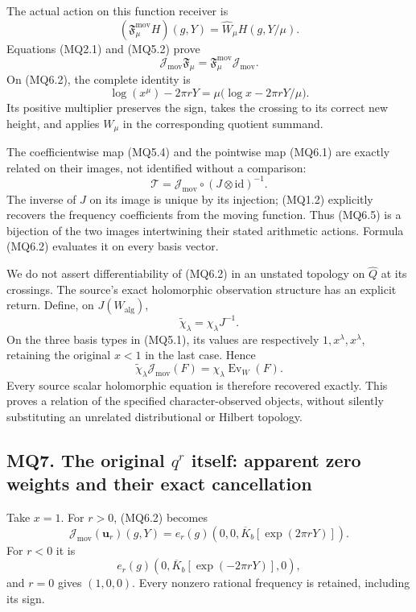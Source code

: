 The actual action on this function receiver is \[
(\mathfrak F_\mu^{\mathrm{mov}}H)(g,Y)
=\widehat W_\mu H(g,Y/\mu).
\tag{MQ6.3}
\] Equations (MQ2.1) and (MQ5.2) prove \[
\mathcal J_{\mathrm{mov}}\mathfrak F_\mu
=\mathfrak F_\mu^{\mathrm{mov}}\mathcal J_{\mathrm{mov}}.
\] On (MQ6.2), the complete identity is \[
\log(x^\mu)-2\pi rY
=\mu\bigl(\log x-2\pi rY/\mu\bigr).
\tag{MQ6.4}
\] Its positive multiplier preserves the sign, takes the crossing to its
correct new height, and applies \(W_\mu\) in the corresponding quotient
summand.

The coefficientwise map (MQ5.4) and the pointwise map (MQ6.1) are
exactly related on their images, not identified without a comparison: \[
\mathcal T=
\mathcal J_{\mathrm{mov}}\circ
(J\otimes\mathrm{id})^{-1}.
\tag{MQ6.5}
\] The inverse of \(J\) on its image is unique by its injection; (MQ1.2)
explicitly recovers the frequency coefficients from the moving function.
Thus (MQ6.5) is a bijection of the two images intertwining their stated
arithmetic actions. Formula (MQ6.2) evaluates it on every basis vector.

We do not assert differentiability of (MQ6.2) in an unstated topology on
\(\widehat Q\) at its crossings. The source's exact holomorphic
observation structure has an explicit return. Define, on
\(J(W_{\mathrm{alg}})\), \[
\widetilde\chi_\lambda=\chi_\lambda J^{-1}.
\] On the three basis types in (MQ5.1), its values are respectively
\(1,x^\lambda,x^\lambda\), retaining the original \(x<1\) in the last
case. Hence \[
\widetilde\chi_\lambda\mathcal J_{\mathrm{mov}}(F)
=\chi_\lambda\operatorname{Ev}_W(F).
\tag{MQ6.6}
\] Every source scalar holomorphic equation is therefore recovered
exactly. This proves a relation of the specified character-observed
objects, without silently substituting an unrelated distributional or
Hilbert topology.

\subsection{\texorpdfstring{MQ7. The original \(q^r\) itself: apparent
zero weights and their exact
cancellation}{MQ7. The original q\^{}r itself: apparent zero weights and their exact cancellation}}\label{mq7.-the-original-qr-itself-apparent-zero-weights-and-their-exact-cancellation}

Take \(x=1\). For \(r>0\), (MQ6.2) becomes \[
\mathcal J_{\mathrm{mov}}(\mathbf u_r)(g,Y)
=e_r(g)(0,0,\overline K_b[\exp(2\pi rY)]).
\] For \(r<0\) it is \[
e_r(g)(0,\overline K_b[\exp(-2\pi rY)],0),
\] and \(r=0\) gives \((1,0,0)\). Every nonzero rational frequency is
retained, including its sign.

